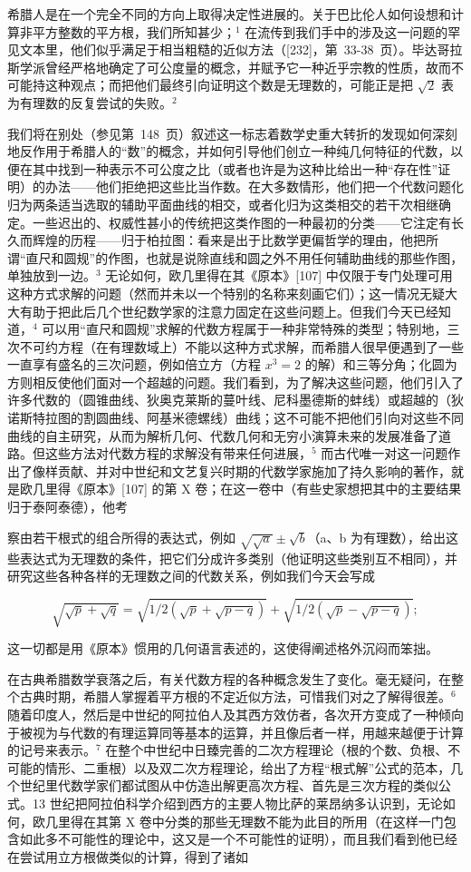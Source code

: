 希腊人是在一个完全不同的方向上取得决定性进展的。关于巴比伦人如何设想和计算非平方整数的平方根，我们所知甚少；\(^{1}\) 在流传到我们手中的涉及这一问题的罕见文本里，他们似乎满足于相当粗糙的近似方法（{[}232{]}，第~33-38~页）。毕达哥拉斯学派曾经严格地确定了可公度量的概念，并赋予它一种近乎宗教的性质，故而不可能持这种观点；而把他们最终引向证明这个数是无理数的，可能正是把 \(\sqrt{2}\) 表为有理数的反复尝试的失败。\(^{2}\)

我们将在别处（参见第~148~页）叙述这一标志着数学史重大转折的发现如何深刻地反作用于希腊人的“数”的概念，并如何引导他们创立一种纯几何特征的代数，以便在其中找到一种表示不可公度之比（或者也许是为这种比给出一种“存在性”证明）的办法——他们拒绝把这些比当作数。在大多数情形，他们把一个代数问题化归为两条适当选取的辅助平面曲线的相交，或者化归为这类相交的若干次相继确定。一些迟出的、权威性甚小的传统把这类作图的一种最初的分类——它注定有长久而辉煌的历程——归于柏拉图：看来是出于比数学更偏哲学的理由，他把所谓“直尺和圆规”的作图，也就是说除直线和圆之外不用任何辅助曲线的那些作图，单独放到一边。\(^{3}\) 无论如何，欧几里得在其《原本》{[}107{]} 中仅限于专门处理可用这种方式求解的问题（然而并未以一个特别的名称来刻画它们）；这一情况无疑大大有助于把此后几个世纪数学家的注意力固定在这些问题上。但我们今天已经知道，\(^{4}\) 可以用“直尺和圆规”求解的代数方程属于一种非常特殊的类型；特别地，三次不可约方程（在有理数域上）不能以这种方式求解，而希腊人很早便遇到了一些一直享有盛名的三次问题，例如倍立方（方程 \(x^{3}=2\) 的解）和三等分角；化圆为方则相反使他们面对一个超越的问题。我们看到，为了解决这些问题，他们引入了许多代数的（圆锥曲线、狄奥克莱斯的蔓叶线、尼科墨德斯的蚌线）或超越的（狄诺斯特拉图的割圆曲线、阿基米德螺线）曲线；这不可能不把他们引向对这些不同曲线的自主研究，从而为解析几何、代数几何和无穷小演算未来的发展准备了道路。但这些方法对代数方程的求解没有带来任何进展，\(^{5}\) 而古代唯一对这一问题作出了像样贡献、并对中世纪和文艺复兴时期的代数学家施加了持久影响的著作，就是欧几里得《原本》{[}107{]} 的第 X 卷；在这一卷中（有些史家想把其中的主要结果归于泰阿泰德），他考

察由若干根式的组合所得的表达式，例如 \(\sqrt{\sqrt{a}} \pm \sqrt{b}\)（a、b 为有理数），给出这些表达式为无理数的条件，把它们分成许多类别（他证明这些类别互不相同），并研究这些各种各样的无理数之间的代数关系，例如我们今天会写成

\[
\sqrt {\sqrt {p} + \sqrt {q}} = \sqrt {1 / 2 (\sqrt {p} + \sqrt {p - q})} + \sqrt {1 / 2 (\sqrt {p} - \sqrt {p - q})};
\]

这一切都是用《原本》惯用的几何语言表述的，这使得阐述格外沉闷而笨拙。

在古典希腊数学衰落之后，有关代数方程的各种概念发生了变化。毫无疑问，在整个古典时期，希腊人掌握着平方根的不定近似方法，可惜我们对之了解得很差。\(^{6}\) 随着印度人，然后是中世纪的阿拉伯人及其西方效仿者，各次开方变成了一种倾向于被视为与代数的有理运算同等基本的运算，并且像后者一样，用越来越便于计算的记号来表示。\(^{7}\) 在整个中世纪中日臻完善的二次方程理论（根的个数、负根、不可能的情形、二重根）以及双二次方程理论，给出了方程“根式解”公式的范本，几个世纪里代数学家们都试图从中仿造出解更高次方程、首先是三次方程的类似公式。13 世纪把阿拉伯科学介绍到西方的主要人物比萨的莱昂纳多认识到，无论如何，欧几里得在其第 X 卷中分类的那些无理数不能为此目的所用（在这样一门包含如此多不可能性的理论中，这又是一个不可能性的证明），而且我们看到他已经在尝试用立方根做类似的计算，得到了诸如

